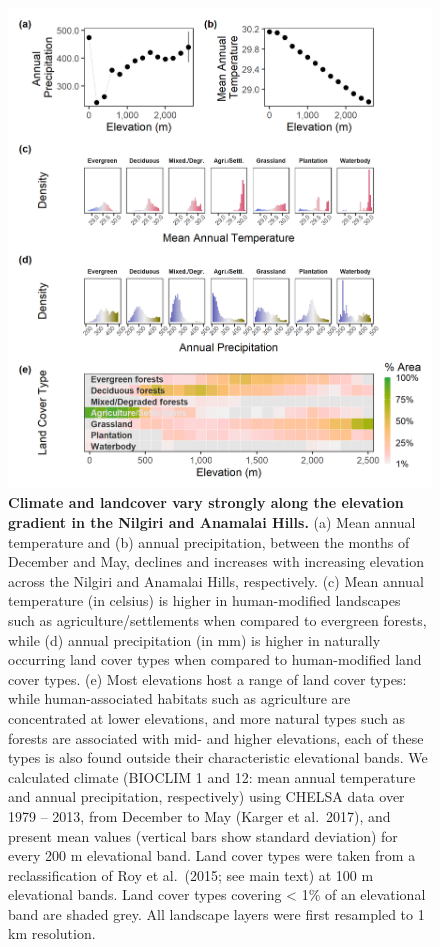 \documentclass[
]{article}
\begin{document}
\begin{figure}
\centering
\includegraphics{figs/fig_02.png}
\caption{\textbf{Climate and landcover vary strongly along the elevation gradient in the Nilgiri and Anamalai Hills.}
(a) Mean annual temperature and (b) annual precipitation, between the months of December and May, declines and increases with increasing elevation across the Nilgiri and Anamalai Hills, respectively. (c) Mean annual temperature (in celsius) is higher in human-modified landscapes such as agriculture/settlements when compared to evergreen forests, while (d) annual precipitation (in mm) is higher in naturally occurring land cover types when compared to human-modified land cover types. (e) Most elevations host a range of land cover types: while human-associated habitats such as agriculture are concentrated at lower elevations, and more natural types such as forests are associated with mid- and higher elevations, each of these types is also found outside their characteristic elevational bands. We calculated climate (BIOCLIM 1 and 12: mean annual temperature and annual precipitation, respectively) using CHELSA data over 1979 -- 2013, from December to May (Karger et al.~2017), and present mean values (vertical bars show standard deviation) for every 200 m elevational band. Land cover types were taken from a reclassification of Roy et al.~(2015; see main text) at 100 m elevational bands. Land cover types covering \textless{} 1\% of an elevational band are shaded grey. All landscape layers were first resampled to 1 km resolution.}
\end{figure}
\end{document}
